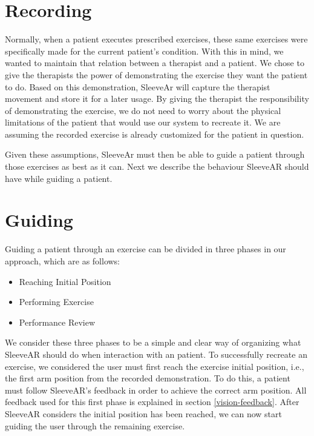 
\section{Recording}

 Normally, when a patient executes prescribed exercises, these same exercises were specifically made for the current patient's condition. 
With this in mind, we wanted to maintain that relation between a therapist and a patient. 
We chose to give the therapists the power of demonstrating the exercise they want the patient to do. 
Based on this demonstration, SleeveAr will capture the therapist movement and store it for a later usage.
By giving the therapist the responsibility of demonstrating the exercise, we do not need to worry about the physical limitations of the patient that would use our system to recreate it. 
We are assuming the recorded exercise is already customized for the patient in question.

Given these assumptions, SleeveAr must then be able to guide a patient through those exercises as best as it can. Next we describe the behaviour SleeveAR should have while guiding a patient.


\section{Guiding}

Guiding a patient through an exercise can be divided in three phases in our approach, which are as follows:

\begin{itemize}
\item Reaching Initial Position
\item Performing Exercise
\item Performance Review
\end{itemize}

We consider these three phases to be a simple and clear way of organizing what SleeveAR should do when interaction with an patient.
To successfully recreate an exercise, we considered the user must first reach the exercise initial position, i.e., the first arm position from the recorded demonstration.
To do this, a patient must follow SleeveAR's feedback in order to achieve the correct arm position. 
All feedback used for this first phase is explained in section \ref{vision-feedback}.
After SleeveAR considers the initial position has been reached, we can now start guiding the user through the remaining exercise.

